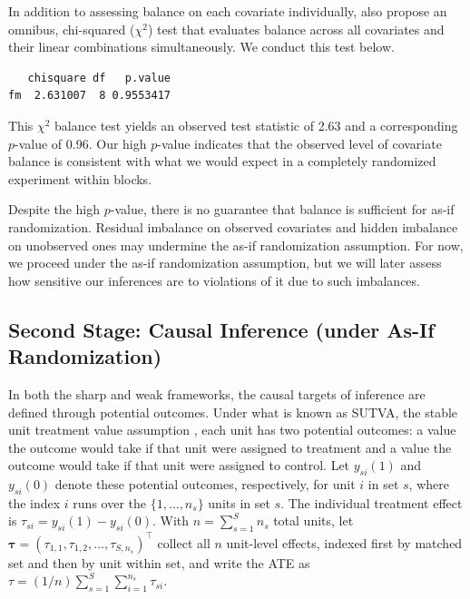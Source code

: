 \documentclass[
  12pt,
  leqno]{article}
\newenvironment{Shaded}{\begin{snugshade}}{\end{snugshade}}
\newcommand{\CommentTok}[1]{\textcolor[rgb]{0.56,0.35,0.01}{\textit{#1}}}
\newcommand{\NormalTok}[1]{#1}
\newcommand{\SpecialCharTok}[1]{\textcolor[rgb]{0.81,0.36,0.00}{\textbf{#1}}}
\newcommand{\StringTok}[1]{\textcolor[rgb]{0.31,0.60,0.02}{#1}}
\begin{document}
In addition to assessing balance on each covariate individually,
\citet{hansenbowers2008} also propose an omnibus, chi-squared
(\(\chi^2\)) test that evaluates balance across all covariates and their
linear combinations simultaneously. We conduct this test below.

\singlespacing

\begin{Shaded}
\end{Shaded}

\begin{verbatim}
   chisquare df   p.value
fm  2.631007  8 0.9553417
\end{verbatim}

\doublespacing

This \(\chi^2\) balance test yields an observed test statistic of 2.63
and a corresponding \(p\)-value of 0.96. Our high \(p\)-value indicates
that the observed level of covariate balance is consistent with what we
would expect in a completely randomized experiment within blocks.

Despite the high \(p\)-value, there is no guarantee that balance is
sufficient for as-if randomization. Residual imbalance on observed
covariates and hidden imbalance on unobserved ones may undermine the
as-if randomization assumption. For now, we proceed under the as-if
randomization assumption, but we will later assess how sensitive our
inferences are to violations of it due to such imbalances.

\subsection{Second Stage: Causal Inference (under As-If
Randomization)}\label{second-stage-causal-inference-under-as-if-randomization}

In both the sharp and weak frameworks, the causal targets of inference
are defined through potential outcomes. Under what is known as SUTVA,
the stable unit treatment value assumption
\citep{rubin1980, rubin1986, cox1958}, each unit has two potential
outcomes: a value the outcome would take if that unit were assigned to
treatment and a value the outcome would take if that unit were assigned
to control. Let \(y_{si}(1)\) and \(y_{si}(0)\) denote these potential
outcomes, respectively, for unit \(i\) in set \(s\), where the index
\(i\) runs over the \(\{1, \ldots, n_s\}\) units in set \(s\). The
individual treatment effect is \(\tau_{si} = y_{si}(1) - y_{si}(0)\).
With \(n = \sum_{s = 1}^S n_s\) total units, let
\(\bm{\tau} = (\tau_{1,1}, \tau_{1,2}, \ldots, \tau_{S,n_s})^{\top}\)
collect all \(n\) unit-level effects, indexed first by matched set and
then by unit within set, and write the ATE as
\(\tau = (1/n) \sum_{s=1}^S \sum_{i=1}^{n_s} \tau_{si}\).
\end{document}
